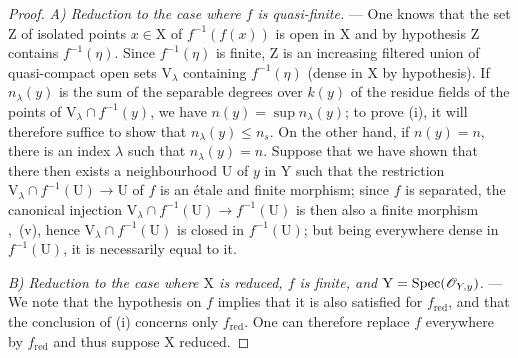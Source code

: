\begin{proof}
\emph{A) Reduction to the case where $f$ is quasi-finite.} ---
One knows  that the set $\mathrm{Z}$ of isolated points $x\in\mathrm{X}$ of $f^{-1}(f(x))$ is open in $\mathrm{X}$ and by hypothesis $\mathrm{Z}$ contains $f^{-1}(\eta)$.
Since $f^{-1}(\eta)$ is finite, $\mathrm{Z}$ is an increasing filtered union of quasi-compact open sets $\mathrm{V}_\lambda$ containing $f^{-1}(\eta)$ (dense in $\mathrm{X}$ by hypothesis).
If $n_\lambda(y)$ is the sum of the separable degrees over $k(y)$ of the residue fields of the points of $\mathrm{V}_\lambda\cap f^{-1}(y)$, we have $n(y)=\sup n_\lambda(y)$; to prove (i), it will therefore suffice to show that $n_\lambda(y)\leq n_s$.
On the other hand, if $n(y)=n$, there is an index $\lambda$ such that $n_\lambda(y)=n$. Suppose that we have shown that there then exists a neighbourhood $\mathrm{U}$ of $y$ in $\mathrm{Y}$ such that the restriction $\mathrm{V}_\lambda\cap f^{-1}(\mathrm{U})\to\mathrm{U}$ of $f$ is an \'etale and finite morphism; since $f$ is separated, the canonical injection $\mathrm{V}_\lambda\cap f^{-1}(\mathrm{U})\to f^{-1}(\mathrm{U})$ is then also a finite morphism ,~(v), hence $\mathrm{V}_\lambda\cap f^{-1}(\mathrm{U})$ is closed in $f^{-1}(\mathrm{U})$; but being everywhere dense in $f^{-1}(\mathrm{U})$, it is necessarily equal to it.

\emph{B) Reduction to the case where $\mathrm{X}$ is reduced, $f$ is finite, and $\mathrm{Y}=\operatorname{Spec}(\mathscr{O}_{Y,y})$.} ---
We note that the hypothesis on $f$ implies that it is also satisfied for $f_{\mathrm{red}}$, and that the conclusion of (i) concerns only $f_{\mathrm{red}}$.
One can therefore replace $f$ everywhere by $f_{\mathrm{red}}$ and thus suppose $\mathrm{X}$ reduced.


\end{proof}
